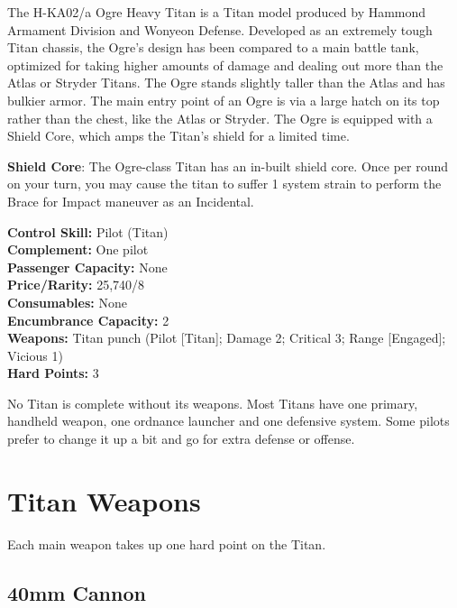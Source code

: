\documentclass[9pt, openany]{extbook}
\begin{document}
The H-KA02/a Ogre Heavy Titan is a Titan model produced by Hammond Armament Division and Wonyeon Defense. Developed as an extremely tough Titan chassis, the Ogre's design has been compared to a main battle tank, optimized for taking higher amounts of damage and dealing out more than the Atlas or Stryder Titans. The Ogre stands slightly taller than the Atlas and has bulkier armor. The main entry point of an Ogre is via a large hatch on its top rather than the chest, like the Atlas or Stryder. The Ogre is equipped with a Shield Core, which amps the Titan's shield for a limited time.

\textbf{Shield Core}: The Ogre-class Titan has an in-built shield core. Once per round on your turn, you may cause the titan to suffer 1 system strain to perform the Brace for Impact maneuver as an Incidental.\\[3em]



\begin{multicols}{2}
\noindent\textbf{Control Skill:} Pilot (Titan)\\
\noindent\textbf{Complement:} One pilot\\
\noindent\textbf{Passenger Capacity:} None\\
\noindent\textbf{Price/Rarity:} 25,740/8\\
\noindent\textbf{Consumables:} None\\
\noindent\textbf{Encumbrance Capacity:} 2\\
\noindent\textbf{Weapons:} Titan punch (Pilot [Titan]; Damage 2; Critical 3; Range [Engaged]; Vicious 1)\\
\noindent\textbf{Hard Points:} 3
\end{multicols}



No Titan is complete without its weapons. Most Titans have one primary, handheld weapon, one ordnance launcher and one defensive system. Some pilots prefer to change it up a bit and go for extra defense or offense. 

\section{Titan Weapons}

Each main weapon takes up one hard point on the Titan.

\subsection{40mm Cannon}
\end{document}
